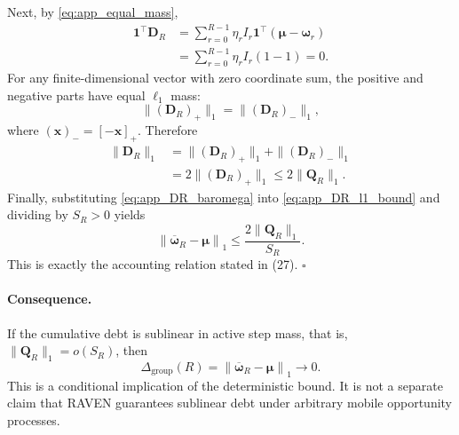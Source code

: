 Next, by \eqref{eq:app_equal_mass},
\begin{align}
    \mathbf{1}^{\top}\mathbf{D}_R
    &=
    \sum_{r=0}^{R-1}
    \eta_rI_r
    \mathbf{1}^{\top}
    \left(
    \boldsymbol\mu-\boldsymbol\omega_r
    \right)
    \nonumber\\
    &=
    \sum_{r=0}^{R-1}
    \eta_rI_r(1-1)
    =0.
    \label{eq:app_DR_zero_sum}
\end{align}
For any finite-dimensional vector with zero coordinate sum, the positive and
negative parts have equal $\ell_1$ mass:
\begin{equation}
    \|(\mathbf{D}_R)_+\|_1
    =
    \|(\mathbf{D}_R)_-\|_1,
    \label{eq:app_pos_neg_equal}
\end{equation}
where $(\mathbf{x})_-=[-\mathbf{x}]_+$.  Therefore
\begin{equation}
\begin{aligned}
    \|\mathbf{D}_R\|_1
    &=
    \|(\mathbf{D}_R)_+\|_1
    +
    \|(\mathbf{D}_R)_-\|_1\\
    &=2\|(\mathbf{D}_R)_+\|_1
    \le
    2\|\mathbf{Q}_R\|_1.
\end{aligned}
    \label{eq:app_DR_l1_bound}
\end{equation}
Finally, substituting
\eqref{eq:app_DR_baromega} into
\eqref{eq:app_DR_l1_bound} and dividing by $S_R>0$ yields
\begin{equation}
    \left\|
    \overline{\boldsymbol\omega}_R
    -
    \boldsymbol\mu
    \right\|_1
    \le
    \frac{
    2\|\mathbf{Q}_R\|_1
    }{
    S_R
    }.
    \label{eq:app_debt_bound_final}
\end{equation}
This is exactly the accounting relation stated in
(27). \hfill$\square$

\paragraph{Consequence.}
If the cumulative debt is sublinear in active step mass, that is,
$\|\mathbf{Q}_R\|_1=o(S_R)$, then
\begin{equation}
    \Delta_{\mathrm{group}}(R)
    =
    \left\|
    \overline{\boldsymbol\omega}_R
    -
    \boldsymbol\mu
    \right\|_1
    \longrightarrow0.
    \label{eq:app_debt_sublinear_consequence}
\end{equation}
This is a conditional implication of the deterministic bound.  It is not a
separate claim that RAVEN guarantees sublinear debt under arbitrary mobile
opportunity processes.



